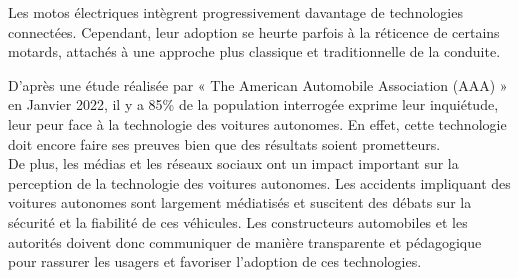 Les motos électriques intègrent progressivement davantage de technologies connectées. Cependant, leur adoption se heurte parfois à la réticence de certains motards, attachés à une approche plus classique et traditionnelle de la conduite.
\vspace{0.5cm}

D'après une étude réalisée par « The American Automobile Association (AAA) »\cite{consumer_skepticim} en Janvier 2022, il y a 85\% de la population interrogée exprime leur inquiétude, leur peur face à la technologie des voitures autonomes. En effet, cette technologie doit encore faire ses preuves bien que des résultats soient prometteurs.\\
De plus, les médias et les réseaux sociaux ont un impact important sur la perception de la technologie des voitures autonomes. Les accidents impliquant des voitures autonomes sont largement médiatisés et suscitent des débats sur la sécurité et la fiabilité de ces véhicules. Les constructeurs automobiles et les autorités doivent donc communiquer de manière transparente et pédagogique pour rassurer les usagers et favoriser l’adoption de ces technologies.\\
\vspace{0.5cm}

